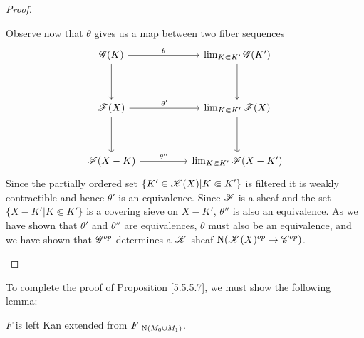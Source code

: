\documentclass[../../thesis.tex]{subfiles}
\begin{document}
\begin{proof}
\begin{enumerate}
              Observe now that $\theta$ gives us a map between two fiber sequences
              \[\begin{tikzcd}
                      {\G(K)} && {\lim_{K\Subset K'}\G(K')} \\
                      \\
                      {\F(X)} && {\lim_{K\Subset K'}\F(X)} \\
                      \\
                      {\F(X-K)} && {\lim_{K\Subset K'}\F(X-K')}
                      \arrow["\theta", from=1-1, to=1-3]
                      \arrow["{\theta'}", from=3-1, to=3-3]
                      \arrow["{\theta''}", from=5-1, to=5-3]
                      \arrow[from=1-1, to=3-1]
                      \arrow[from=3-1, to=5-1]
                      \arrow[from=1-3, to=3-3]
                      \arrow[from=3-3, to=5-3]
                  \end{tikzcd}\]
              Since the partially ordered set $\{K'\in \mathscr{K}(X) | K\Subset K'\}$ is filtered it is weakly contractible and hence $\theta'$ is an equivalence.
              Since $\mathscr{F}$ is a sheaf and the set $\{X-K' | K \Subset K'\}$ is a covering sieve on $X-K'$, $\theta''$ is also an equivalence.
              As we have shown that $\theta'$ and $\theta''$ are equivalences, $\theta$ must also be an equivalence, and we have shown that $\mathscr{G}^{op}$ determines a $\mathscr{K}$-sheaf $\mathrm{N}(\mathscr{K}(X)^{op} \to \mathscr{C}^{op})$.
    \end{enumerate}
\end{proof}
To complete the proof of Proposition \ref{5.5.5.7}, we must show the following lemma:
\begin{lemma}
    $F$ is left Kan extended from $F|_{\mathrm{N}(M_0\cup M_1)}$.
\end{lemma}
\end{document}
